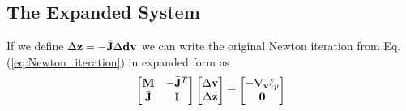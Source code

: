 \subsection{The Expanded System}
If we define $\Delta{\mathbf{z}}=-\bar{{\mathbf{J}}}\Delta{\mathbf{dv}}$ we can write the original Newton iteration from Eq. (\ref{eq:Newton_iteration}) in expanded form as
\begin{eqnarray}
	\begin{bmatrix}
		{\mathbf{M}} & -\bar{{\mathbf{J}}}^T\\
		\bar{{\mathbf{J}}} & {\mathbf{I}}
	\end{bmatrix}
	\begin{bmatrix}
		\Delta{\mathbf{v}}\\
		\Delta{\mathbf{z}}
	\end{bmatrix}=
	\begin{bmatrix}
		-\nabla_{\mathbf{v}}\ell_p\\
		{\mathbf{0}}
	\end{bmatrix}	
\end{eqnarray}
